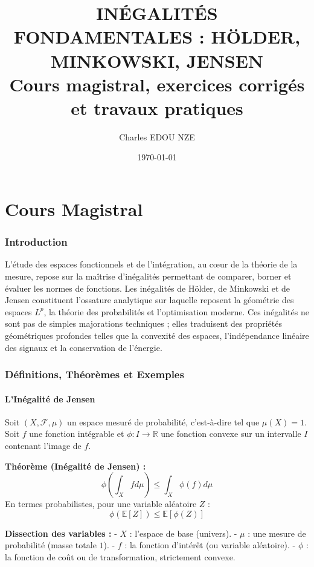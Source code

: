 \documentclass[11pt,a4paper]{article}
\title{\Huge INÉGALITÉS FONDAMENTALES : HÖLDER, MINKOWSKI, JENSEN \\ \large Cours magistral, exercices corrigés et travaux pratiques}
\author{\Large Charles EDOU NZE}
\date{\today}
\begin{document}
\maketitle
\tableofcontents
\newpage

\part{Cours Magistral}


\section{Introduction}

L'étude des espaces fonctionnels et de l'intégration, au cœur de la théorie de la mesure, repose sur la maîtrise d'inégalités permettant de comparer, borner et évaluer les normes de fonctions. Les inégalités de Hölder, de Minkowski et de Jensen constituent l'ossature analytique sur laquelle reposent la géométrie des espaces $L^p$, la théorie des probabilités et l'optimisation moderne.
Ces inégalités ne sont pas de simples majorations techniques ; elles traduisent des propriétés géométriques profondes telles que la convexité des espaces, l'indépendance linéaire des signaux et la conservation de l'énergie.

\section{Définitions, Théorèmes et Exemples}

\subsection{L'Inégalité de Jensen}

Soit $(X, \mathcal{F}, \mu)$ un espace mesuré de probabilité, c'est-à-dire tel que $\mu(X) = 1$. Soit $f$ une fonction intégrable et $\phi : I \to \mathbb{R}$ une fonction convexe sur un intervalle $I$ contenant l'image de $f$.

\textbf{Théorème (Inégalité de Jensen) :}
$$ \phi \left( \int_X f d\mu \right) \le \int_X \phi(f) d\mu $$
En termes probabilistes, pour une variable aléatoire $Z$ :
$$ \phi(\mathbb{E}[Z]) \le \mathbb{E}[\phi(Z)] $$

\textbf{Dissection des variables :}
- $X$ : l'espace de base (univers).
- $\mu$ : une mesure de probabilité (masse totale $1$).
- $f$ : la fonction d'intérêt (ou variable aléatoire).
- $\phi$ : la fonction de coût ou de transformation, strictement convexe.
\end{document}
